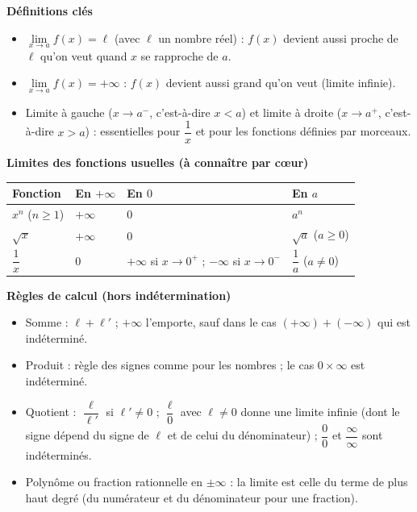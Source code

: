 \documentclass[11pt]{article}
\newcommand{\cle}[1]{{\popxbold\color{popdark}#1}}
\begin{document}
\begin{aretenir}
\textbf{Définitions clés}
\begin{itemize}
\item $\lim\limits_{x\to a} f(x) = \ell$ (avec $\ell$ un nombre réel) : $f(x)$ devient aussi proche de $\ell$ qu'on veut quand $x$ se rapproche de $a$.
\item $\lim\limits_{x\to a} f(x) = +\infty$ : $f(x)$ devient aussi grand qu'on veut (limite infinie).
\item Limite à gauche ($x\to a^-$, c'est-à-dire $x<a$) et limite à droite ($x\to a^+$, c'est-à-dire $x>a$) : essentielles pour $\dfrac{1}{x}$ et pour les fonctions définies par morceaux.
\end{itemize}

\textbf{Limites des fonctions usuelles (à connaître par cœur)}
\begin{center}
\begin{tabularx}{\linewidth}{|l|X|X|X|}
\hline
\rowcolor{popblueL} Fonction & En $+\infty$ & En $0$ & En $a$ \\
\hline
$x^n$ ($n\geq 1$) & $+\infty$ & $0$ & $a^n$ \\
\hline
$\sqrt{x}$ & $+\infty$ & $0$ & $\sqrt{a}$ ($a\geq 0$) \\
\hline
$\dfrac{1}{x}$ & $0$ & $+\infty$ si $x\to 0^+$ ; $-\infty$ si $x\to 0^-$ & $\dfrac{1}{a}$ ($a\neq 0$) \\
\hline
\end{tabularx}
\end{center}

\textbf{Règles de calcul (hors indétermination)}
\begin{itemize}
\item Somme : $\ell+\ell'$ ; $+\infty$ l'emporte, sauf dans le cas $(+\infty)+(-\infty)$ qui est indéterminé.
\item Produit : règle des signes comme pour les nombres ; le cas $0\times\infty$ est indéterminé.
\item Quotient : $\dfrac{\ell}{\ell'}$ si $\ell'\neq 0$ ; $\dfrac{\ell}{0}$ avec $\ell\neq 0$ donne une limite infinie (dont le signe dépend du signe de $\ell$ et de celui du dénominateur) ; $\dfrac{0}{0}$ et $\dfrac{\infty}{\infty}$ sont indéterminés.
\item Polynôme ou fraction rationnelle en $\pm\infty$ : la limite est celle du \cle{terme de plus haut degré} (du numérateur et du dénominateur pour une fraction).
\end{itemize}


\end{aretenir}
\end{document}
